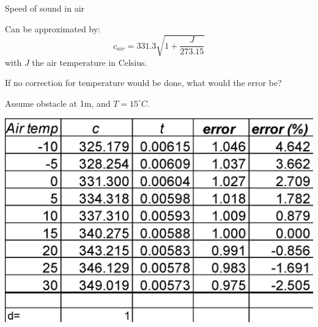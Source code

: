 \documentclass[compress]{beamer}
\begin{document}
\begin{frame}{Speed of sound in air}

Can be approximated by:
    \[
        c_{air} = 331.3 \sqrt{1+\frac{J}{273.15}}
        \]
    with $J$ the air temperature in Celsius.

If no correction for temperature would be done, what would the error be?

    \begin{multicols}{2}
        Assume obstacle at 1m, and $T = 15^{\circ}C$.

        \begin{center}
            \includegraphics[width=\linewidth]{sound_speed_error}
        \end{center}
    \end{multicols}


\end{frame}
\end{document}
